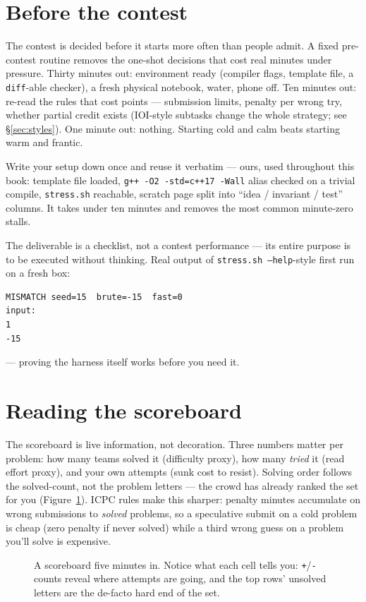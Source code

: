 \section{Before the contest}\label{sec:before}
The contest is decided before it starts more often than people
admit. A fixed pre-contest routine removes the one-shot
decisions that cost real minutes under pressure. Thirty minutes
out: environment ready (compiler flags, template file, a
\texttt{diff}-able checker), a fresh physical notebook, water,
phone off. Ten minutes out: re-read the rules that cost points
--- submission limits, penalty per wrong try, whether partial
credit exists (IOI-style subtasks change the whole strategy;
see \S\ref{sec:styles}). One minute out: nothing. Starting
cold and calm beats starting warm and frantic.

\begin{example}
Write your setup down once and reuse it verbatim --- ours, used
throughout this book: template file loaded,
\texttt{g++ -O2 -std=c++17 -Wall} alias checked on a trivial
compile, \texttt{stress.sh} reachable, scratch page split into
``idea / invariant / test'' columns. It takes under ten
minutes and removes the most common minute-zero stalls.
\end{example}
\begin{solution}
The deliverable is a checklist, not a contest performance ---
its entire purpose is to be executed without thinking. Real
output of \texttt{stress.sh --help}-style first run on a fresh
box:
\begin{verbatim}
MISMATCH seed=15  brute=-15  fast=0
input:
1
-15
\end{verbatim}
--- proving the harness itself works before you need it.
\end{solution}

\section{Reading the scoreboard}\label{sec:board}
The scoreboard is live information, not decoration. Three
numbers matter per problem: how many teams solved it
(difficulty proxy), how many \emph{tried} it (read effort
proxy), and your own attempts (sunk cost to resist). Solving
order follows the solved-count, not the problem letters --- the
crowd has already ranked the set for you
(Figure~\ref{fig:board}). ICPC rules make this sharper: penalty
minutes accumulate on wrong submissions to \emph{solved}
problems, so a speculative submit on a cold problem is cheap
(zero penalty if never solved) while a third wrong guess on a
problem you'll solve is expensive.
\begin{figure}[ht]\centering

\caption{A scoreboard five minutes in. Notice what each cell
tells you: \texttt{+}/\texttt{-} counts reveal where attempts
are going, and the top rows' unsolved letters are the de-facto
hard end of the set.}
\label{fig:board}
\end{figure}

